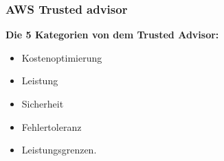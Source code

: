 \subsubsection{AWS Trusted advisor}

\textbf{Die 5 Kategorien von dem Trusted Advisor:}

\begin{itemize}
  \item
        Kostenoptimierung

  \item
        Leistung
  \item
        Sicherheit
  \item
        Fehlertoleranz
  \item
        Leistungsgrenzen.
\end{itemize}\textbf{}





